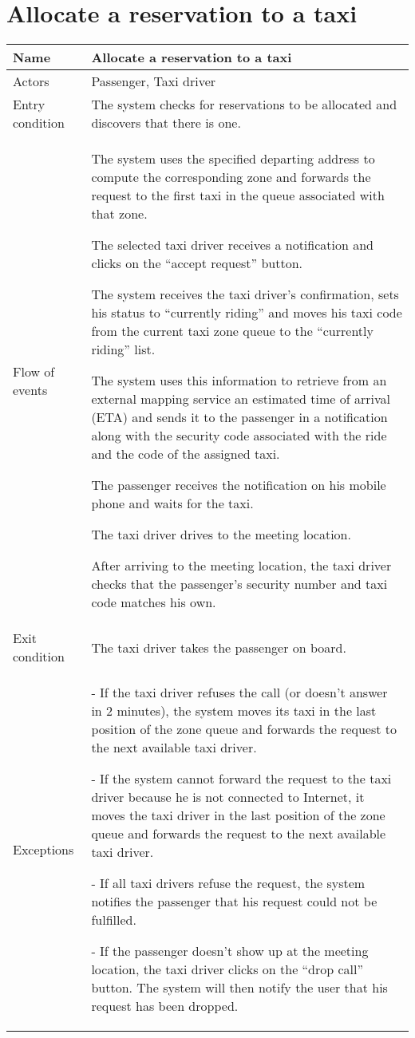 \section{Allocate a reservation to a taxi}
\begin{center}
\begin{longtable}{|l| p{9cm}|}
\hline
Name &
Allocate a reservation to a taxi \\
\hline
Actors &
Passenger, Taxi driver \\
\hline
Entry condition & 
The system checks for reservations to be allocated and discovers that there is one. \\
\hline
Flow of events & 
The system uses the specified departing address to compute the corresponding zone and forwards the request to the first taxi in the queue associated with that zone.

The selected taxi driver receives a notification
and clicks on the ``accept request'' button.

The system receives the taxi driver's confirmation, sets his status to ``currently riding'' and moves his taxi code from the current taxi zone queue to the ``currently riding'' list.

The system uses this information to retrieve from an external mapping service an estimated time of arrival (ETA) and sends it to the passenger in a notification along with the security code associated with the ride and the code of the assigned taxi.

The passenger receives the notification on his mobile phone and waits for the taxi.

The taxi driver drives to the meeting location.

After arriving to the meeting location, the taxi driver checks that the passenger's security number and taxi code matches his own. \\
\hline
Exit condition &
The taxi driver takes the passenger on board. \\
\hline
Exceptions &
- If the taxi driver refuses the call (or doesn't answer in 2 minutes), the system moves its taxi in the last position of the zone queue and forwards the request to the next available taxi driver.

- If the system cannot forward the request to the taxi driver because he is not connected to Internet, it moves the taxi driver in the last position of the zone queue and forwards the request to the next available taxi driver.

- If all taxi drivers refuse the request, the system notifies the passenger that his request could not be fulfilled.

- If the passenger doesn't show up at the meeting location, the taxi driver clicks on the ``drop call'' button. The system will then notify the user that his request has been dropped. \\
\hline
\end{longtable}
\end{center}


